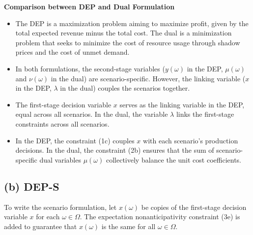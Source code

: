 \documentclass[8pt]{article}
\begin{document}
\textbf{Comparison between DEP and Dual Formulation}

\begin{itemize}
    \item The DEP is a maximization problem aiming to maximize profit, given by the total
          expected revenue minus the total cost. The dual is a minimization problem that
          seeks to minimize the cost of resource usage through shadow prices and the cost
          of unmet demand.

    \item In both formulations, the second-stage variables ($y(\omega)$ in the DEP,
          $\mu(\omega)$ and $\nu(\omega)$ in the dual) are scenario-specific. However,
          the linking variable ($x$ in the DEP, $\lambda$ in the dual) couples the
          scenarios together.

    \item The first-stage decision variable $x$ serves as the linking variable in the
          DEP, equal across all scenarios. In the dual, the variable $\lambda$ links the
          first-stage constraints across all scenarios.

    \item In the DEP, the constraint (1c) couples $x$ with each scenario’s production
          decisions. In the dual, the constraint (2b) ensures that the sum of
          scenario-specific dual variables $\mu(\omega)$ collectively balance the unit
          cost coefficients.
\end{itemize}

\subsection*{(b) DEP-S}
To write the scenario formulation, let $x(\omega)$ be copies of the first-stage
decision variable $x$ for each $\omega \in \Omega$. The expectation
nonanticipativity constraint (3e) is added to guarantee that $x(\omega)$ is the
same for all $\omega \in \Omega$.
\end{document}
